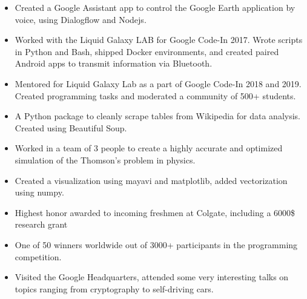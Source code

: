 \documentclass[a4paper]{resume}
\begin{document}
\enresubsection
{}
\begin{itemize} \vspace{-5pt} \itemsep -2pt
	\item Created a Google Assistant app to control the Google Earth application by voice, using Dialogflow and Nodejs.
	\item Worked with the Liquid Galaxy LAB for Google Code-In 2017. Wrote scripts in Python and Bash, shipped Docker environments, and created paired Android apps to transmit information via Bluetooth.
	\item Mentored for Liquid Galaxy Lab as a part of Google Code-In 2018 and 2019. Created programming tasks and moderated a community of 500+ students.
\end{itemize}
\enresection

\begin{itemize} \vspace{-5pt} \itemsep -2pt
	\item A Python package to cleanly scrape tables from Wikipedia for data analysis. Created using Beautiful Soup.
\end{itemize}
\enresubsection
{}
\begin{itemize} \vspace{-5pt} \itemsep -2pt
	\item Worked in a team of 3 people to create a highly accurate and optimized simulation of the Thomson’s problem in physics.
	\item Created a visualization using mayavi and matplotlib, added vectorization using numpy.
\end{itemize}
\enresection

\begin{itemize} \vspace{-5pt} \itemsep -2pt
	\item Highest honor awarded to incoming freshmen at Colgate, including a 6000\$ research grant
\end{itemize}
\enresubsection
{}
\begin{itemize} \vspace{-5pt} \itemsep -2pt
	\item One of 50 winners worldwide out of 3000+ participants in the programming competition.
	\item Visited the Google Headquarters, attended some very interesting talks on topics ranging from cryptography to self-driving cars.
\end{itemize}
\enresection
\end{document}
